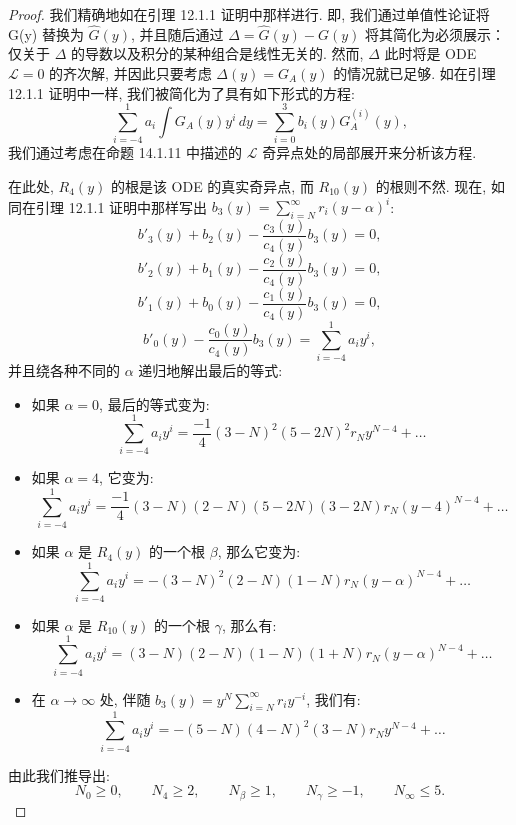 \begin{proof}
我们精确地如在引理 12.1.1 证明中那样进行. 
即, 我们通过单值性论证将 G(y) 替换为 \(\widehat{G}(y)\), 
并且随后通过 \(\Delta = \widehat{G}(y) - G(y)\) 将其简化为必须展示：仅关于 \(\Delta\) 的导数以及积分的某种组合是线性无关的. 
然而, \(\Delta\) 此时将是 ODE \(\mathcal{L} = 0\) 的齐次解, 
并因此只要考虑 \(\Delta(y) = G_A(y)\) 的情况就已足够. 
如在引理 12.1.1 证明中一样, 
我们被简化为了具有如下形式的方程:
\begin{equation}\label{eq:14.3.2}
\sum_{i=-4}^{1} a_i \int G_A(y) y^i \, dy = \sum_{i=0}^{3} b_i(y) G_A^{(i)}(y),
\end{equation}
我们通过考虑在命题 14.1.11 中描述的 \(\mathcal{L}\) 奇异点处的局部展开来分析该方程.

在此处, \(R_4(y)\) 的根是该 ODE 的真实奇异点, 
而 \(R_{10}(y)\) 的根则不然. 
现在, 如同在引理 12.1.1 证明中那样写出 \(b_3(y) = \sum_{i=N}^{\infty} r_i (y - \alpha)^i\):
\begin{equation}\label{eq:14.3.3}
b'_{3}(y) + b_{2}(y) - \frac{c_{3}(y)}{c_{4}(y)}b_{3}(y) = 0,
\end{equation}
\[ b'_{2}(y) + b_{1}(y) - \frac{c_{2}(y)}{c_{4}(y)}b_{3}(y) = 0, \]
\[ b'_{1}(y) + b_{0}(y) - \frac{c_{1}(y)}{c_{4}(y)}b_{3}(y) = 0, \]
\[ b'_{0}(y) - \frac{c_{0}(y)}{c_{4}(y)}b_{3}(y) = \sum_{i=-4}^{1} a_{i}y^{i}, \]
并且绕各种不同的 \(\alpha\) 递归地解出最后的等式:
\begin{itemize}
  \item[(1)] 如果 \(\alpha = 0\), 最后的等式变为:
  \[ \sum_{i=-4}^{1} a_i y^i = \frac{-1}{4} (3-N)^2 (5-2N)^2 r_N y^{N-4} + \dots \]
  \item[(2)] 如果 \(\alpha = 4\), 它变为:
  \[ \sum_{i=-4}^{1} a_i y^i = \frac{-1}{4} (3-N)(2-N)(5-2N)(3-2N)r_N(y-4)^{N-4} + \dots \]
  \item[(3)] 如果 \(\alpha\) 是 \(R_4(y)\) 的一个根 \(\beta\), 那么它变为:
  \[ \sum_{i=-4}^{1} a_i y^i = -(3-N)^2 (2-N)(1-N)r_N (y-\alpha)^{N-4} + \dots \]
  \item[(4)] 如果 \(\alpha\) 是 \(R_{10}(y)\) 的一个根 \(\gamma\), 那么有:
  \[ \sum_{i=-4}^{1} a_i y^i = (3-N)(2-N)(1-N)(1+N)r_N(y-\alpha)^{N-4} + \dots \]
  \item[(5)] 在 \(\alpha \to \infty\) 处, 伴随 \(b_3(y) = y^N \sum_{i=N}^{\infty} r_i y^{-i}\), 我们有:
  \[ \sum_{i=-4}^{1} a_i y^i = -(5-N)(4-N)^2(3-N)r_N y^{N-4} + \dots \]
\end{itemize}
由此我们推导出:
\begin{equation}\label{eq:14.3.4}
N_0 \ge 0, \qquad N_4 \ge 2, \qquad N_\beta \ge 1, \qquad N_\gamma \ge -1, \qquad N_\infty \le 5.

\end{equation}
\end{proof}
